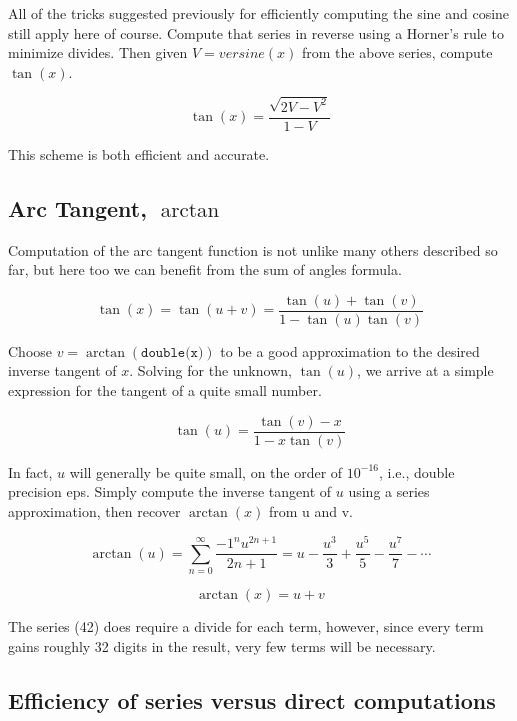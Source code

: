 \documentclass[a4paper,12pt]{article}
\begin{document}
All of the tricks suggested previously for efficiently computing the sine and cosine still apply here of course. Compute that series in reverse using a Horner's rule to minimize divides. Then given $V = versine(x)$ from the above series, compute $\tan(x)$.

\begin{equation}
\tan(x) = \frac{\sqrt{2V - V^2}}{1-V}
\end{equation}

This scheme is both efficient and accurate.


\subsection{Arc Tangent, $\arctan$}

Computation of the arc tangent function is not unlike many others described so far, but here too we can benefit from the sum of angles formula.

\begin{equation}
\tan(x) = \tan(u + v) = \frac{\tan(u) + \tan(v)}{1 - \tan(u)\tan(v)}
\end{equation}

Choose $v = \arctan(\texttt{double(x)})$ to be a good approximation to the desired inverse tangent of $x$. Solving for the unknown, $\tan(u)$, we arrive at a simple expression for the tangent of a quite small number.

\begin{equation}
\tan(u) = \frac{\tan(v) - x}{1 - x\tan(v)}
\end{equation}

In fact, $u$ will generally be quite small, on the order of $10^{{-16}}$, i.e., double precision eps. Simply compute the inverse tangent of $u$ using a series approximation, then recover $\arctan(x)$ from u and v.

\begin{equation}
\arctan(u) = \sum_{n = 0}^{\infty} \frac{-1^n u^{2n+1}}{2n+1} = u - \frac{u^3}{3} + \frac{u^5}{5} - \frac{u^7}{7} - \cdots
\end{equation}

\begin{equation}
\arctan(x) = u + v
\end{equation}

The series (42) does require a divide for each term, however, since every term gains roughly 32 digits in the result, very few terms will be necessary.

\subsection{Efficiency of series versus direct computations}
\end{document}
